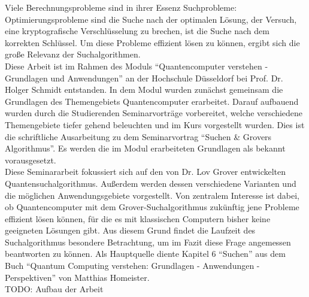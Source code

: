 Viele Berechnungsprobleme sind in ihrer Essenz Suchprobleme: Optimierungsprobleme sind die Suche nach der optimalen Lösung, der Versuch, eine kryptografische Verschlüsselung zu brechen, ist die Suche nach dem korrekten Schlüssel. Um diese Probleme effizient lösen zu können, ergibt sich die große Relevanz der Suchalgorithmen.
\\
Diese Arbeit ist im Rahmen des Moduls “Quantencomputer verstehen - Grundlagen und Anwendungen” an der Hochschule Düsseldorf bei Prof. Dr. Holger Schmidt entstanden. In dem Modul wurden zunächst gemeinsam die Grundlagen des Themengebiets Quantencomputer erarbeitet. Darauf aufbauend wurden durch die Studierenden Seminarvorträge vorbereitet, welche verschiedene Themengebiete tiefer gehend beleuchten und im Kurs vorgestellt wurden. Dies ist die schriftliche Ausarbeitung zu dem Seminarvortrag “Suchen \& Grovers Algorithmus”. Es werden die im Modul erarbeiteten Grundlagen als bekannt vorausgesetzt.
\newline
\\
Diese Seminararbeit fokussiert sich auf den von Dr. Lov Grover entwickelten Quantensuchalgorithmus. Außerdem werden dessen verschiedene Varianten und die möglichen Anwendungsgebiete vorgestellt.
Von zentralem Interesse ist dabei, ob Quantencomputer mit dem Grover-Suchalgorithmus zukünftig jene Probleme effizient lösen können, für die es mit klassischen Computern bisher keine geeigneten Lösungen gibt. 
Aus diesem Grund findet die Laufzeit des Suchalgorithmus besondere Betrachtung, um im Fazit diese Frage angemessen beantworten zu können. 
Als Hauptquelle diente Kapitel 6 “Suchen” aus dem Buch “Quantum Computing verstehen: Grundlagen - Anwendungen - Perspektiven” von Matthias Homeister.
\newline
\\
TODO: Aufbau der Arbeit